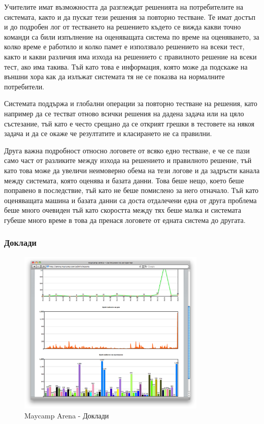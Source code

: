 \documentclass[a4paper,12pt]{article}
\begin{document}
  Учителите имат възможността да разглеждат решенията на потребителите на системата, както и да пускат тези решения за повторно тестване. Те имат достъп и до подробен лог от тестването на решението където се вижда какви точно команди са били изпълнение на оценяващата система по време на оценяването, за колко време е работило и колко памет е използвало решението на всеки тест, както и какви различия има изхода на решението с правилното решение на всеки тест, ако има такива. Тъй като това е информация, която може да подскаже на външни хора как да излъжат системата тя не се показва на нормалните потребители.
  
  Системата поддържа и глобални операции за повторно тестване на решения, като например да се тестват отново всички решения на дадена задача или на цяло състезание, тъй като е често срещано да се открият грешки в тестовете на някоя задача и да се окаже че резултатите и класирането не са правилни.
  
  Друга важна подробност относно логовете от всяко едно тестване, е че се пази само част от разликите между изхода на решението и правилното решение, тъй като това може да увеличи неимоверно обема на тези логове и да задръсти канала между системата, която оценява и базата данни. Това беше нещо, което беше поправено в последствие, тъй като не беше помислено за него отначало. Тъй като оценяващата машина и базата данни са доста отдалечени една от друга проблема беше много очевиден тъй като скоростта между тях беше малка и системата губеше много време в това да пренася логовете от едната система до другата.
  
  \subsubsection{Доклади}

  \begin{figure}[ht]
    \begin{center}
      \includegraphics[width=0.8\textwidth]{images/maycamp_arena_reports.png}
    \end{center}
    \caption{Maycamp Arena - Доклади}
    \label{arena_reports}
  \end{figure}
  
\end{document}
